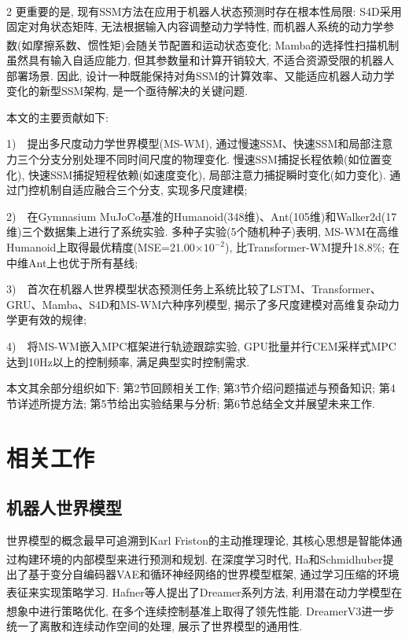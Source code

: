 \begin{multicols}{2}
更重要的是, 现有SSM方法在应用于机器人状态预测时存在根本性局限:
S4D\textsuperscript{\cite{7}}采用固定对角状态矩阵, 无法根据输入内容调整动力学特性,
而机器人系统的动力学参数(如摩擦系数、惯性矩)会随关节配置和运动状态变化;
Mamba\textsuperscript{\cite{8}}的选择性扫描机制虽然具有输入自适应能力, 但其参数量和计算开销较大,
不适合资源受限的机器人部署场景.
因此, 设计一种既能保持对角SSM的计算效率、又能适应机器人动力学变化的新型SSM架构, 是一个亟待解决的关键问题.

本文的主要贡献如下:

1)~~提出多尺度动力学世界模型(MS-WM), 通过慢速SSM、快速SSM和局部注意力三个分支分别处理不同时间尺度的物理变化. 慢速SSM捕捉长程依赖(如位置变化), 快速SSM捕捉短程依赖(如速度变化), 局部注意力捕捉瞬时变化(如力变化). 通过门控机制自适应融合三个分支, 实现多尺度建模;

2)~~在Gymnasium MuJoCo基准的Humanoid(348维)、Ant(105维)和Walker2d(17维)三个数据集上进行了系统实验. 多种子实验(5个随机种子)表明, MS-WM在高维Humanoid上取得最优精度(MSE=21.00$\times10^{-2}$), 比Transformer-WM提升18.8\%; 在中维Ant上也优于所有基线;

3)~~首次在机器人世界模型状态预测任务上系统比较了LSTM、Transformer、GRU、Mamba、S4D和MS-WM六种序列模型, 揭示了多尺度建模对高维复杂动力学更有效的规律;

4)~~将MS-WM嵌入MPC框架进行轨迹跟踪实验, GPU批量并行CEM采样式MPC达到10Hz以上的控制频率, 满足典型实时控制需求.

本文其余部分组织如下: 第2节回顾相关工作; 第3节介绍问题描述与预备知识; 第4节详述所提方法; 第5节给出实验结果与分析; 第6节总结全文并展望未来工作.

\section{相关工作}

\subsection{机器人世界模型}

世界模型的概念最早可追溯到Karl Friston的主动推理理论,
其核心思想是智能体通过构建环境的内部模型来进行预测和规划.
在深度学习时代, Ha和Schmidhuber\textsuperscript{\cite{2}}提出了基于变分自编码器VAE和循环神经网络的世界模型框架,
通过学习压缩的环境表征来实现策略学习.
Hafner等人\textsuperscript{\cite{10}}提出了Dreamer系列方法, 利用潜在动力学模型在想象中进行策略优化,
在多个连续控制基准上取得了领先性能.
DreamerV3\textsuperscript{\cite{11}}进一步统一了离散和连续动作空间的处理, 展示了世界模型的通用性.


\end{multicols}
